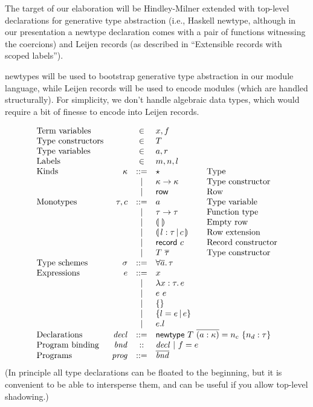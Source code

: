 \documentclass{article}
\begin{document}
The target of our elaboration will be Hindley-Milner extended with
top-level declarations for generative type abstraction (i.e., Haskell
\textsf{newtype}, although in our presentation a newtype declaration
comes with a pair of functions witnessing the coercions) and Leijen
records (as described in ``Extensible records with scoped labels'').

\textsf{newtype}s will be used to bootstrap generative type abstraction
in our module language, while Leijen records will be used to encode
modules (which are handled structurally).  For simplicity, we don't
handle algebraic data types, which would require a bit of finesse to
encode into Leijen records.

\[
\begin{array}{lrcll}
\mbox{Term variables} &&\in& x, f \\
\mbox{Type constructors} &&\in& T \\
\mbox{Type variables} &&\in& a, r \\
\mbox{Labels} &&\in& m, n, l \\
\mbox{Kinds} & \kappa &::=& \star & \mbox{Type} \\
       && | & \kappa \rightarrow \kappa & \mbox{Type constructor} \\
       && | & \row & \mbox{Row} \\
\mbox{Monotypes} & \tau, c &::=& a & \mbox{Type variable} \\
      && | & \tau \rightarrow \tau & \mbox{Function type} \\
      && | & \rowty{} & \mbox{Empty row} \\
      && | & \rowty{l : \tau \,|\, c} & \mbox{Row extension} \\
      && | & \record{c} & \mbox{Record constructor} \\
      && | & T~\overline{\tau} & \mbox{Type constructor} \\
\mbox{Type schemes} & \sigma &::=& \forall \overline{a}.\, \tau \\
\mbox{Expressions} & e &::=& x \\
 && | & \lambda x : \tau.\, e \\
 && | & e~e \\
 && | & \{\} \\
 && | & \{ l = e \,|\, e \} \\
 && | & e.l \\
\mbox{Declarations} & \I{decl} &::=& \multicolumn{2}{l}{\mathsf{newtype}~T~\overline{(a : \kappa)} = n_c~\{ n_d : \tau \}} \\
\mbox{Program binding} & \I{bnd} &::& \I{decl} ~|~ f = e \\
\mbox{Programs} & \I{prog} &::=& \overline{\I{bnd}} \\
\end{array}
\]
%
(In principle all type declarations can be floated to the beginning, but
it is convenient to be able to intersperse them, and can be useful if
you allow top-level shadowing.)
\end{document}
